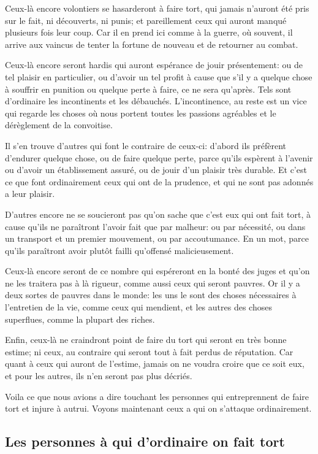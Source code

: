 Ceux-là encore volontiers se hasarderont à faire tort, qui jamais n'auront été pris sur le fait, ni découverts,
ni punis; et pareillement ceux qui auront manqué plusieurs fois leur coup. Car il en prend ici comme à la
guerre, où souvent, il arrive aux vaincus de tenter la fortune de nouveau et de retourner au combat.

Ceux-là encore seront hardis qui auront espérance de jouir présentement: ou de tel plaisir en particulier, ou
d'avoir un tel profit à cause que s'il y a quelque chose à souffrir en punition ou quelque perte à faire, ce
ne sera qu'après. Tels sont d'ordinaire les incontinents et les débauchés. L'incontinence, au reste est un vice
qui regarde les choses où nous portent toutes les passions agréables et le dérèglement de la convoitise.

Il s'en trouve d'autres qui font le contraire de ceux-ci: d'abord ils préfèrent d'endurer quelque chose, ou de
faire quelque perte, parce qu'ils espèrent à l'avenir ou d'avoir un établissement assuré, ou de jouir d'un plaisir
très durable. Et c'est ce que font ordinairement ceux qui ont de la prudence, et qui ne sont pas adonnés a leur
plaisir. 

D'autres encore ne se soucieront pas qu'on sache que c'est eux qui ont fait tort, à cause qu'ils ne paraîtront
l'avoir fait que par malheur: ou par nécessité, ou dans un transport et un premier mouvement, ou par accoutumance.
En un mot, parce qu'ils paraîtront avoir plutôt failli qu'offensé malicieusement.

Ceux-là encore seront de ce nombre qui espéreront en la bonté des juges et qu'on ne les traitera pas à là rigueur,
comme aussi ceux qui seront pauvres. Or il y a deux sortes de pauvres dans le monde: les uns le sont des choses
nécessaires à l'entretien de la vie, comme ceux qui mendient, et les autres des choses superflues, comme la plupart
des riches. 

Enfin, ceux-là ne craindront point de faire du tort qui seront en très bonne estime; ni ceux, au contraire qui
seront tout à fait perdus de réputation. Car quant à ceux qui auront de l'estime, jamais on ne voudra croire que
ce soit eux, et pour les autres, ils n'en seront pas plus décriés.

Voila ce que nous avions a dire touchant les personnes qui entreprennent de faire tort et injure à autrui. Voyons
maintenant ceux a qui on s'attaque ordinairement.

\subsection{Les personnes à qui d'ordinaire on fait tort}

